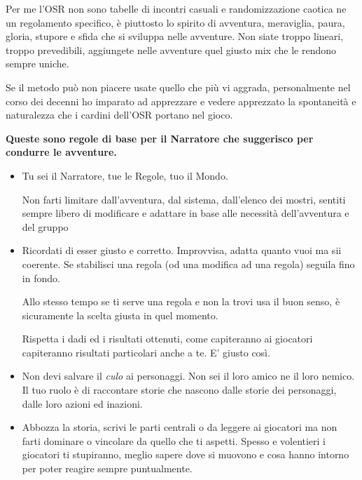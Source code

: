 \begin{multicols}{2}
Per me l'OSR non sono tabelle di incontri casuali e randomizzazione caotica ne un regolamento specifico, è piuttosto lo spirito di avventura, meraviglia, paura, gloria, stupore e sfida che si sviluppa nelle avventure. Non siate troppo lineari, troppo prevedibili, aggiungete nelle avventure quel giusto mix che le rendono sempre uniche.

Se il metodo può non piacere usate quello che più vi aggrada, personalmente nel corso dei decenni ho imparato ad apprezzare e vedere apprezzato la spontaneità e naturalezza che i cardini dell'OSR portano nel gioco.

\bigskip

\textbf{Queste sono regole di base per il Narratore che suggerisco per condurre le avventure.}

\medskip

\begin{itemize}[leftmargin=*] \setlength{\itemsep}{0pt}

\item
Tu sei il Narratore, tue le Regole, tuo il Mondo.

Non farti limitare dall'avventura, dal sistema, dall'elenco dei mostri, sentiti sempre libero di modificare e adattare in base alle necessità dell'avventura e del gruppo

\item
Ricordati di esser giusto e corretto. Improvvisa, adatta quanto vuoi ma sii coerente. Se stabilisci una regola (od una modifica ad una regola) seguila fino in fondo.

Allo stesso tempo se ti serve una regola e non la trovi usa il buon senso, è sicuramente la scelta giusta in quel momento.

Rispetta i dadi ed i risultati ottenuti, come capiteranno ai giocatori capiteranno risultati particolari anche a te. E' giusto così.

\item
Non devi salvare il \emph{culo} ai personaggi. Non sei il loro amico ne il loro nemico. Il tuo ruolo è di raccontare storie che nascono dalle storie dei personaggi, dalle loro azioni ed inazioni.

\item
Abbozza la storia, scrivi le parti centrali o da leggere ai giocatori ma non farti dominare o vincolare da quello che ti aspetti. Spesso e volentieri i giocatori ti stupiranno, meglio sapere dove si muovono e cosa hanno intorno per poter reagire sempre puntualmente.


\end{itemize}
\end{multicols}
